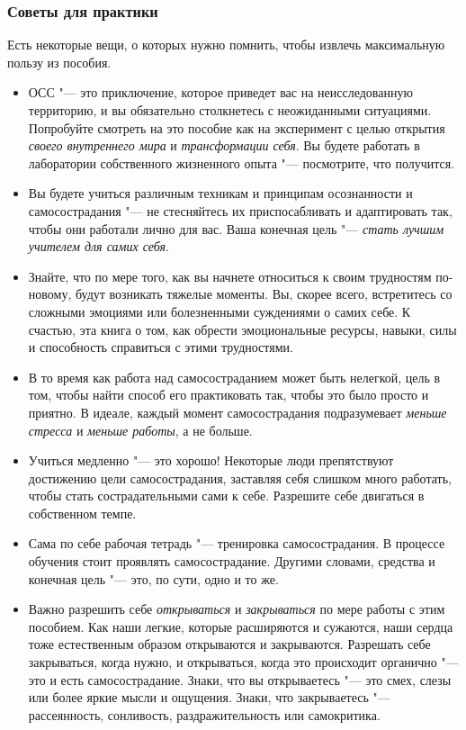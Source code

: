 	
	\subsubsection*{Советы для практики}
	
	Есть некоторые вещи, о которых нужно помнить, чтобы извлечь максимальную пользу из пособия.  
	\begin{itemize}
		\item ОСС "--- это приключение, которое приведет вас на неисследованную территорию, и вы обязательно столкнетесь с неожиданными ситуациями.  Попробуйте смотреть на это пособие как на эксперимент с целью открытия \emph{своего внутреннего мира} и \emph{трансформации себя}. Вы будете работать в лаборатории собственного жизненного опыта "--- посмотрите, что получится.
		\item Вы будете учиться различным техникам и принципам осознанности и самосострадания "--- не стесняйтесь их приспосабливать и адаптировать так, чтобы они работали лично для вас. Ваша конечная цель "--- \emph{стать лучшим учителем для самих себя}.
		\item Знайте, что по мере того, как вы начнете относиться к своим трудностям по-новому, будут возникать тяжелые моменты. Вы, скорее всего, встретитесь со сложными эмоциями или болезненными суждениями о самих себе. К счастью, эта книга о том, как обрести эмоциональные ресурсы, навыки, силы и способность справиться с этими трудностями. 
		\item В то время как работа над самосостраданием может быть нелегкой, цель в том, чтобы найти способ его практиковать так, чтобы это было просто и приятно. В идеале,  каждый момент самосострадания подразумевает \emph{меньше стресса} и \emph{меньше работы}, а не больше. 
		\item Учиться медленно "--- это хорошо! Некоторые люди препятствуют достижению цели самосострадания, заставляя себя слишком много работать, чтобы стать сострадательными сами к себе. Разрешите себе двигаться в собственном темпе. 
		\item Сама по себе рабочая тетрадь "--- тренировка самосострадания. В процессе обучения стоит проявлять самосострадание. Другими словами, средства и конечная цель "--- это, по сути, одно и то же.
		\item Важно разрешить себе \emph{открываться} и \emph{закрываться} по мере работы с этим пособием. Как наши легкие, которые расширяются и сужаются, наши сердца тоже естественным образом открываются и закрываются. Разрешать себе закрываться, когда нужно, и открываться, когда это происходит органично "--- это и есть самосострадание. Знаки, что вы открываетесь "--- это смех, слезы или более яркие мысли и ощущения. Знаки, что закрываетесь "--- рассеянность, сонливость, раздражительность или самокритика.

\end{itemize}
